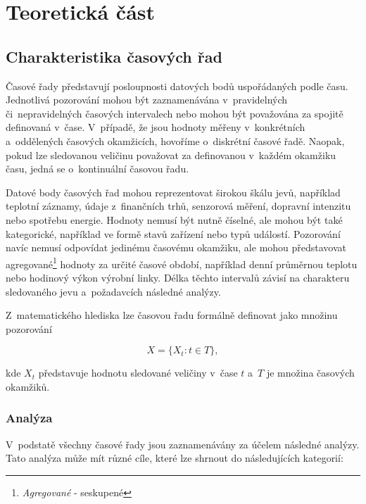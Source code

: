 \chapter{Teoretická část}\label{theoretical}
\section{Charakteristika časových řad}
Časové řady představují posloupnosti datových bodů uspořádaných podle času. 
Jednotlivá pozorování mohou být zaznamenávána v~pravidelných či~nepravidelných časových intervalech nebo mohou být považována za spojitě definovaná v~čase. 
V~případě, že jsou hodnoty měřeny v~konkrétních a~oddělených časových okamžicích, hovoříme o~diskrétní časové řadě. 
Naopak, pokud lze sledovanou veličinu považovat za definovanou v~každém okamžiku času, jedná se o~kontinuální časovou řadu. 
\cite{diggle2025time}

Datové body časových řad mohou reprezentovat širokou škálu jevů, například teplotní záznamy, údaje z~finančních trhů, senzorová měření, dopravní intenzitu nebo spotřebu energie. 
Hodnoty nemusí být nutně číselné, ale mohou být také kategorické, například ve formě stavů zařízení nebo typů událostí. 
Pozorování navíc nemusí odpovídat jedinému časovému okamžiku, ale mohou představovat agregované\footnote{\textit{Agregované} - seskupené} hodnoty za určité časové období, například denní průměrnou teplotu nebo hodinový výkon výrobní linky. 
Délka těchto intervalů závisí na charakteru sledovaného jevu a~požadavcích následné analýzy.
\cite{diggle2025time}

Z~matematického hlediska lze časovou řadu formálně definovat jako množinu pozorování

\begin{equation}
X = \{X_t : t \in T\},
\end{equation}

kde \(X_t\) představuje hodnotu sledované veličiny v~čase \(t\) a~\(T\) je množina časových okamžiků.
\cite{diggle2025time}

\subsection{Analýza}
V~podstatě všechny časové řady jsou zaznamenávány za účelem následné analýzy. Tato analýza může mít různé cíle, které lze shrnout do následujících kategorií:

